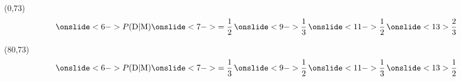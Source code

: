 \documentclass[shownotes,aspectratio=169]{beamer}
\begin{document}
\begin{frame}
{}



\begin{textblock}{80}(0,73) \centering
 \begin{equation*}
 \onslide<6->{ P(\text{D}|\text{M}) }  \onslide<7->{= \frac{1}{2}} \, \onslide<9->{\frac{1}{3}} \, \onslide<11->{\frac{1}{2}} \, \onslide<13>{\frac{2}{3}}
 \end{equation*}
\end{textblock}
\begin{textblock}{80}(80,73) \centering
\begin{equation*}
 \onslide<6->{ P(\text{D}|\text{M})}  \onslide<7->{= \frac{1}{3}} \, \onslide<9->{\frac{1}{2}} \, \onslide<11->{\frac{1}{3}} \, \onslide<13>{\frac{1}{2}}
 \end{equation*}
\end{textblock}



\end{frame}
\end{document}
